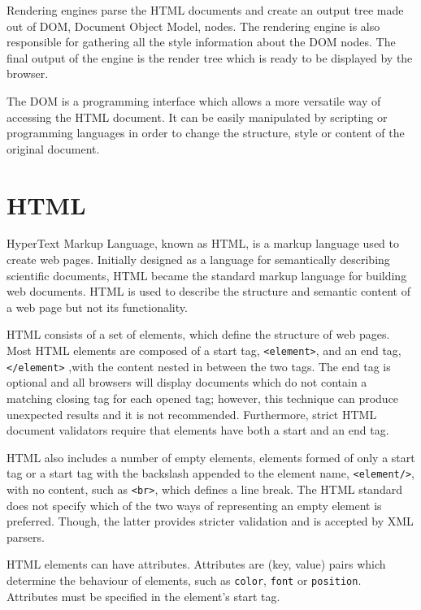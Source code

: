 \documentclass[10pt,a4paper,twoside]{book}
\begin{document}
Rendering engines parse the HTML documents and create an output tree made out of DOM, Document Object Model, nodes. The rendering engine is also responsible for gathering all the style information about the DOM nodes. The final output of the engine is the render tree which is ready to be displayed by the browser\cite{howbrowserswork}.

The DOM is a programming interface which allows a more versatile way of accessing the HTML document. It can be easily manipulated by scripting or programming languages in order to change the structure, style or content of the original document\cite{dom}.

\section{HTML}
HyperText Markup Language, known as HTML, is a markup language used to create web pages. Initially designed as a language for semantically describing scientific documents, HTML became the standard markup language for building web documents. HTML is used to describe the structure and semantic content of a web page but not its functionality\cite{world1999html}.

HTML consists of a set of elements, which define the structure of web pages. Most HTML elements are composed of a start tag, \texttt{<element>}, and an end tag, \texttt{</element>} ,with the content nested in between the two tags. The end tag is optional and all browsers will display documents which do not contain a matching closing tag for each opened tag; however, this technique can produce unexpected results and it is not recommended. Furthermore, strict HTML document validators require that elements have both a start and an end tag\cite{world1999html}.

HTML also includes a number of empty elements, elements formed of only a start tag or a start tag with the backslash appended to the element name, \texttt{<element/>}, with no content, such as \texttt{<br>}, which defines a line break. The HTML standard does not specify which of the two ways of representing an empty element is preferred. Though, the latter provides stricter validation and is accepted by XML parsers\cite{world1999html}.

HTML elements can have attributes. Attributes are (key, value) pairs which determine the behaviour of elements, such as \texttt{color}, \texttt{font} or \texttt{position}. Attributes must be specified in the element's start tag\cite{world1999html}.
\end{document}
